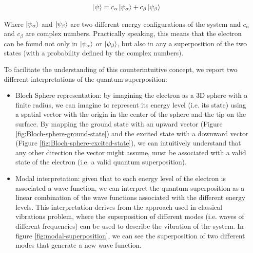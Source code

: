 \begin{equation}
    \ket{\psi} = c_\alpha\ket{\psi_\alpha} + c_\beta\ket{\psi_\beta}
\end{equation}

Where $\ket{\psi_\alpha}$ and $\ket{\psi_\beta}$ are two different energy configurations of the system and $c_\alpha$ and $c_\beta$ are complex numbers.
Practically speaking, this means that the electron can be found not only in $\ket{\psi_\alpha}$ or $\ket{\psi_\beta}$, but also in any a superposition of the two states (with a probability defined by the complex numbers).

To facilitate the understanding of this counterintuitive concept, we report two different interpretations of the quantum superposition:

\begin{itemize}
    \item Bloch Sphere representation: by imagining the electron as a 3D sphere with a finite radius, we can imagine to represent its energy level (i.e. its state) using a spatial vector with the origin in the center of the sphere and the tip on the surface. By mapping the ground state with an upward vector (Figure \ref{fig:Bloch-sphere-ground-state}) and the excited state with a downward vector (Figure \ref{fig:Bloch-sphere-excited-state}), we can intuitively understand that any other direction the vector might assume, must be associated with a valid state of the electron (i.e. a valid quantum superposition).
    \item Modal interpretation: given that to each energy level of the electron is associated a wave function, we can interpret the quantum superposition as a linear combination of the wave functions associated with the different energy levels. This interpretation derives from the approach used in classical vibrations problem, where the superposition of different modes (i.e. waves of different frequencies) can be used to describe the vibration of the system. In figure \ref{fig:modal-superposition}, we can see the superposition of two different modes that generate a new wave function.
\end{itemize}

